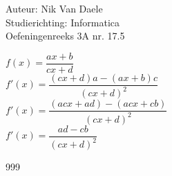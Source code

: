 \documentclass[a4paper]{article}
\begin{document}
  
\noindent \large Auteur: Nik Van Daele \\
\noindent \large Studierichting: Informatica\\
\noindent \large Oefeningenreeks 3A nr. 17.5\\

\medskip

\normalsize

$f(x) = \dfrac{ax + b}{cx+d}$\\

$f'(x) = \dfrac{(cx + d)a - (ax + b)c}{(cx + d)^2}$\\

$f'(x) = \dfrac{(acx + ad) - (acx + cb)}{(cx + d)^2}$\\

$f'(x) = \dfrac{ad - cb}{(cx + d)^2}$


\begin{thebibliography}{999}
\end{thebibliography}
\end{document}

